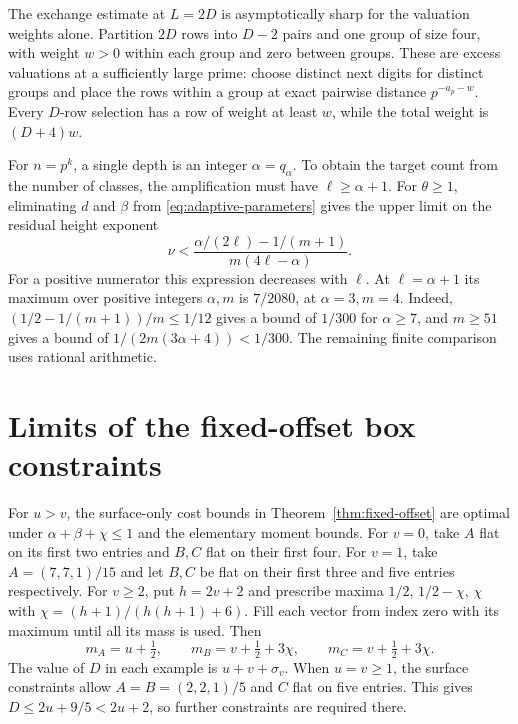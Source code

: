 \documentclass[11pt,reqno]{amsart}
\begin{document}
The exchange estimate at \(L=2D\) is asymptotically sharp
for the valuation weights alone. Partition \(2D\) rows
into \(D-2\) pairs and one group of size four, with weight
\(w>0\) within each group and zero between groups.
These are excess valuations at a sufficiently large prime:
choose distinct next digits for distinct groups and place
the rows within a group at exact pairwise distance
\(p^{-a_p-w}\). Every \(D\)-row selection has a row of weight
at least \(w\), while the total weight is \((D+4)w\).

For \(n=p^k\), a single depth is an integer
\(\alpha=q_\alpha\). To obtain the target count from the
number of classes, the amplification must have
\(\ell\ge\alpha+1\). For \(\theta\ge1\), eliminating \(d\)
and \(\beta\) from \eqref{eq:adaptive-parameters} gives the upper
limit on the residual height exponent
\[
 \nu<
 \frac{\alpha/(2\ell)-1/(m+1)}{m(4\ell-\alpha)}.
\]
For a positive numerator this expression decreases with
\(\ell\). At \(\ell=\alpha+1\) its maximum over positive
integers \(\alpha,m\) is \(7/2080\), at \(\alpha=3,m=4\).
Indeed, \((1/2-1/(m+1))/m\le1/12\) gives a bound of
\(1/300\) for \(\alpha\ge7\), and \(m\ge51\) gives a bound
of \(1/(2m(3\alpha+4))<1/300\). The remaining finite
comparison uses rational arithmetic.

\section{Limits of the fixed-offset box constraints}
For \(u>v\), the surface-only cost bounds in
Theorem~\ref{thm:fixed-offset} are optimal under
\(\alpha+\beta+\chi\le1\) and the elementary moment bounds.
For \(v=0\), take \(A\) flat on its first two entries and \(B,C\)
flat on their first four. For \(v=1\), take
\(A=(7,7,1)/15\) and let \(B,C\) be flat on their first three
and five entries respectively. For \(v\ge2\), put \(h=2v+2\)
and prescribe maxima \(1/2,\,1/2-\chi,\,\chi\) with
\(\chi=(h+1)/(h(h+1)+6)\). Fill each vector from index zero with
its maximum until all its mass is used. Then
\[
 m_A=u+\tfrac12,\qquad
 m_B=v+\tfrac12+3\chi,\qquad m_C=v+\tfrac12+3\chi .
\]
The value of \(D\) in each example is \(u+v+\sigma_v\).
When \(u=v\ge1\), the surface constraints allow \(A=B=(2,2,1)/5\)
and \(C\) flat on five entries. This gives
\(D\le2u+9/5<2u+2\), so further constraints are required there.
\end{document}
